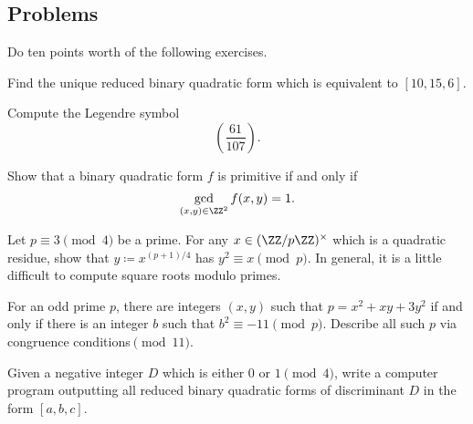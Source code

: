 \documentclass[../notes.tex]{subfiles}
\begin{document}
\subsection{Problems}
Do ten points worth of the following exercises.
\begin{prob}[1 point]
	Find the unique reduced binary quadratic form which is equivalent to $[10,15,6]$.
\end{prob}
\begin{prob}[1 point]
	Compute the Legendre symbol
	\[\left(\frac{61}{107}\right).\]
\end{prob}
\begin{prob}[2 points] \label{prob:more-intinsic-primitive}
	Show that a binary quadratic form $f$ is primitive if and only if
	\[\gcd_{(x,y)\in\ZZ^2}f(x,y)=1.\]
\end{prob}
\begin{prob}[2 points] \label{prob:3-mod-4-square-root}
	Let $p\equiv3\pmod4$ be a prime. For any $x\in(\ZZ/p\ZZ)^\times$ which is a quadratic residue, show that $y\coloneqq x^{(p+1)/4}$ has $y^2\equiv x\pmod p$. In general, it is a little difficult to compute square roots modulo primes.
\end{prob}
\begin{prob}[3 points]
	For an odd prime $p$, there are integers $(x,y)$ such that $p=x^2+xy+3y^2$ if and only if there is an integer $b$ such that $b^2\equiv-11\pmod p$. Describe all such $p$ via congruence conditions$\pmod{11}$.
\end{prob}
\begin{prob}[4 points]
	Given a negative integer $D$ which is either $0$ or $1\pmod4$, write a computer program outputting all reduced binary quadratic forms of discriminant $D$ in the form $[a,b,c]$.
\end{prob}
\end{document}
